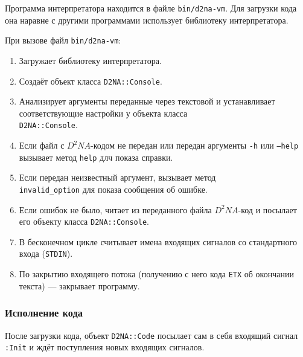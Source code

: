 \documentclass[utf8,a5paper,portrait,10pt,twoside]{eskdtext}
\begin{document}
Программа интерпретатора находится в файле \texttt{bin/d2na-vm}. Для загрузки
кода она наравне с другими программами использует библиотеку интерпретатора.

При вызове файл \texttt{bin/d2na-vm}:
\begin{enumerate}
  \item Загружает библиотеку интерпретатора.
  \item Создаёт объект класса \texttt{D2NA::Console}.
  \item Анализирует аргументы переданные через текстовой и устанавливает
        соответствующие настройки у объекта класса\\ \texttt{D2NA::Console}.
  \item Если файл с $D^2NA$-кодом не передан или передан аргументы \texttt{-h}
        или \texttt{--help} вызывает метод \texttt{help} длч показа справки.
  \item Если передан неизвестный аргумент, вызывает метод\\
        \texttt{invalid\_option} для показа сообщения об ошибке.
  \item Если ошибок не было, читает из переданного файла $D^2NA$-код и посылает
        его объекту класса \texttt{D2NA::Console}.
  \item В бесконечном цикле считывает имена входящих сигналов со стандартного
        входа (\texttt{STDIN}).
  \item По закрытию входящего потока (получению с него кода \texttt{ETX} об
        окончании текста) — закрывает программу.
\end{enumerate}

\newpage
\subsubsection{Исполнение кода}

После загрузки кода, объект \texttt{D2NA::Code} посылает сам в себя входящий
сигнал \texttt{:Init} и ждёт поступления новых входящих сигналов.
\end{document}
